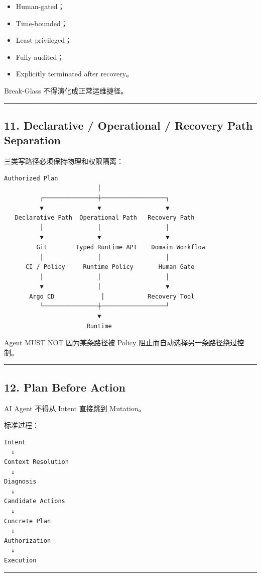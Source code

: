 \documentclass[11pt,a4paper]{article}
\begin{document}
\begin{itemize}
  \item Human-gated；
  \item Time-bounded；
  \item Least-privileged；
  \item Fully audited；
  \item Explicitly terminated after recovery。
\end{itemize}
Break-Glass 不得演化成正常运维捷径。

\vspace{0.5em}\hrule\vspace{0.5em}
\subsection{11. Declarative / Operational / Recovery Path Separation}
三类写路径必须保持物理和权限隔离：

\begin{lstlisting}[language=text]
                    Authorized Plan
                          │
          ┌───────────────┼──────────────────┐
          ▼               ▼                  ▼
   Declarative Path  Operational Path   Recovery Path
          │               │                  │
          ▼               ▼                  ▼
         Git        Typed Runtime API    Domain Workflow
          │               │                  │
      CI / Policy     Runtime Policy       Human Gate
          │               │                  │
          ▼               │                  ▼
       Argo CD             │            Recovery Tool
          └───────────────┼──────────────────┘
                          ▼
                       Runtime
\end{lstlisting}
Agent MUST NOT 因为某条路径被 Policy 阻止而自动选择另一条路径绕过控制。

\vspace{0.5em}\hrule\vspace{0.5em}
\subsection{12. Plan Before Action}
AI Agent 不得从 Intent 直接跳到 Mutation。

标准过程：

\begin{lstlisting}[language=text]
Intent
  ↓
Context Resolution
  ↓
Diagnosis
  ↓
Candidate Actions
  ↓
Concrete Plan
  ↓
Authorization
  ↓
Execution
\end{lstlisting}
\vspace{0.5em}\hrule\vspace{0.5em}
\end{document}
